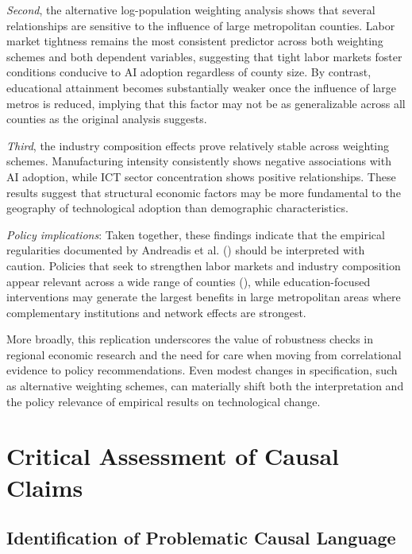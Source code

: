 \documentclass[
]{article}
\begin{document}
\emph{Second}, the alternative log-population weighting analysis shows
that several relationships are sensitive to the influence of large
metropolitan counties. Labor market tightness remains the most
consistent predictor across both weighting schemes and both dependent
variables, suggesting that tight labor markets foster conditions
conducive to AI adoption regardless of county size. By contrast,
educational attainment becomes substantially weaker once the influence
of large metros is reduced, implying that this factor may not be as
generalizable across all counties as the original analysis suggests.

\emph{Third}, the industry composition effects prove relatively stable
across weighting schemes. Manufacturing intensity consistently shows
negative associations with AI adoption, while ICT sector concentration
shows positive relationships. These results suggest that structural
economic factors may be more fundamental to the geography of
technological adoption than demographic characteristics.

\emph{Policy implications}: Taken together, these findings indicate that
the empirical regularities documented by Andreadis et al.
() should be interpreted with caution.
Policies that seek to strengthen labor markets and industry composition
appear relevant across a wide range of counties
(), while
education-focused interventions may generate the largest benefits in
large metropolitan areas where complementary institutions and network
effects are strongest.

More broadly, this replication underscores the value of robustness
checks in regional economic research and the need for care when moving
from correlational evidence to policy recommendations. Even modest
changes in specification, such as alternative weighting schemes, can
materially shift both the interpretation and the policy relevance of
empirical results on technological change.

\section{Critical Assessment of Causal
Claims}\label{critical-assessment-of-causal-claims}

\subsection{Identification of Problematic Causal
Language}\label{identification-of-problematic-causal-language}
\end{document}
